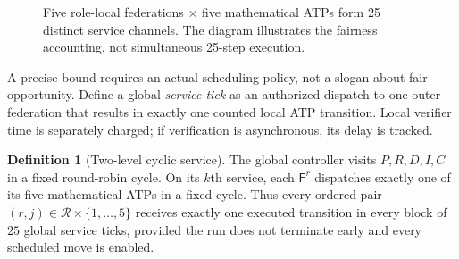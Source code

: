 \documentclass[11pt,letterpaper,oneside]{book}
\theoremstyle{definition}
\newtheorem{definition}[theorem]{Definition}
\theoremstyle{remark}
\newcommand{\Rls}{\mathcal R}
\newcommand{\F}{\mathsf F}
\begin{document}
\begin{figure}[htbp]
\centering
{}
\caption{Five role-local federations $\times$ five mathematical ATPs form 25 distinct service channels. The diagram illustrates the fairness accounting, not simultaneous 25-step execution.}
\label{fig:service}
\end{figure}

A precise bound requires an actual scheduling policy, not a slogan
about fair opportunity. Define a global \emph{service tick} as an
authorized dispatch to one outer federation that results in exactly
one counted local ATP transition. Local verifier time is separately
charged; if verification is asynchronous, its delay is tracked.

\begin{definition}[Two-level cyclic service]
The global controller visits $P,R,D,I,C$ in a fixed round-robin cycle.
On its $k$th service, each $\F^r$ dispatches exactly one of its five
mathematical ATPs in a fixed cycle. Thus every ordered pair
$(r,j)\in\Rls\times\{1,\ldots,5\}$ receives exactly one executed
transition in every block of $25$ global service ticks, provided the
run does not terminate early and every scheduled move is enabled.
\end{definition}
\end{document}
